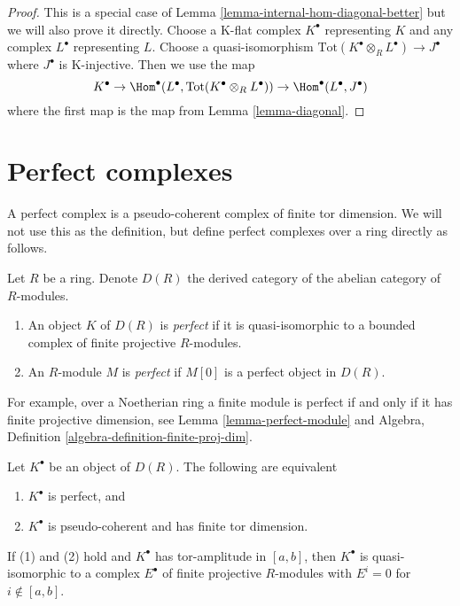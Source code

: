 \begin{proof}
This is a special case of Lemma \ref{lemma-internal-hom-diagonal-better}
but we will also prove it directly.
Choose a K-flat complex $K^\bullet$ representing $K$ and
any complex $L^\bullet$ representing $L$. Choose a quasi-isomorphism
$\text{Tot}(K^\bullet \otimes_R L^\bullet) \to J^\bullet$
where $J^\bullet$ is K-injective. Then we use the map
$$
K^\bullet \to
\Hom^\bullet(L^\bullet, \text{Tot}(K^\bullet \otimes_R L^\bullet))
\to \Hom^\bullet(L^\bullet, J^\bullet)
$$
where the first map is the map from Lemma \ref{lemma-diagonal}.
\end{proof}









\section{Perfect complexes}
\label{section-perfect}

\noindent
A perfect complex is a pseudo-coherent complex of finite tor dimension.
We will not use this as the definition, but define perfect complexes
over a ring directly as follows.

\begin{definition}
\label{definition-perfect}
Let $R$ be a ring. Denote $D(R)$ the derived category of the abelian
category of $R$-modules.
\begin{enumerate}
\item An object $K$ of $D(R)$ is {\it perfect} if it is quasi-isomorphic
to a bounded complex of finite projective $R$-modules.
\item An $R$-module $M$ is {\it perfect} if $M[0]$ is a perfect object
in $D(R)$.
\end{enumerate}
\end{definition}

\noindent
For example, over a Noetherian ring a finite module is perfect if and
only if it has finite projective dimension, see
Lemma \ref{lemma-perfect-module}
and Algebra, Definition \ref{algebra-definition-finite-proj-dim}.

\begin{lemma}
\label{lemma-perfect}
Let $K^\bullet$ be an object of $D(R)$. The following are equivalent
\begin{enumerate}
\item $K^\bullet$ is perfect, and
\item $K^\bullet$ is pseudo-coherent and has finite tor dimension.
\end{enumerate}
If (1) and (2) hold and $K^\bullet$ has tor-amplitude
in $[a, b]$, then $K^\bullet$ is quasi-isomorphic to a complex
$E^\bullet$ of finite projective $R$-modules with $E^i = 0$
for $i \not \in [a, b]$.
\end{lemma}

